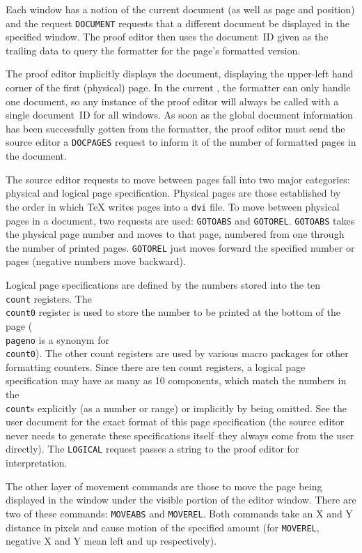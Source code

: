Each window has a notion of the current document (as well as page and
position) and the request {\tt DOCUMENT} requests that a different
document be displayed in the specified window.  The proof editor then
uses the document~ID given as the trailing data to query the formatter
for the page's formatted version.

The proof editor implicitly displays the document, displaying the
upper-left hand corner of the first (physical) page.  In the current
{\VorTeX}, the formatter can only handle one document, so any instance
of the proof editor will always be called with a single document~ID
for all windows.  As soon as the global document information
has been successfully gotten from the formatter, the proof editor must
send the source editor a {\tt DOCPAGES} request to inform it of the
number of formatted pages in the document.

The source editor requests to move between pages fall into two major
categories: physical and logical page specification.  Physical pages
are those established by the order in which {\TeX} writes pages into a
{\tt dvi} file.  To move between physical pages in a document, two
requests are used: {\tt GOTOABS} and {\tt GOTOREL}.  {\tt GOTOABS}
takes the physical page number and moves to that page, numbered from
one through the number of printed pages.  {\tt GOTOREL} just moves
forward the specified number or pages (negative numbers move backward).

Logical page specifications are defined by the numbers stored into the
ten {\tt \\count} registers.  The {\tt \\count0} register is used to
store the number to be printed at the bottom of the page ({\tt
\\pageno} is a synonym for {\tt \\count0}).  The other count registers
are used by various macro packages for other formatting counters.
Since there are ten count registers, a logical page specification may
have as many as 10 components, which match the numbers in the
{\tt\\count}s explicitly (as a number or range) or implicitly by being
omitted.  See the user document for the exact format of this page
specification (the source editor never needs to generate these
specifications itself--they always come from the user directly).
The {\tt LOGICAL} request passes a string to the proof editor for
interpretation.

The other layer of movement commands are those to move the page being
displayed in the window under the visible portion of the editor window.
There are two of these commands: {\tt MOVEABS} and {\tt MOVEREL}.
Both commands take an X and Y distance in pixels and cause motion
of the specified amount (for {\tt MOVEREL}, negative X and Y
mean left and up respectively).

